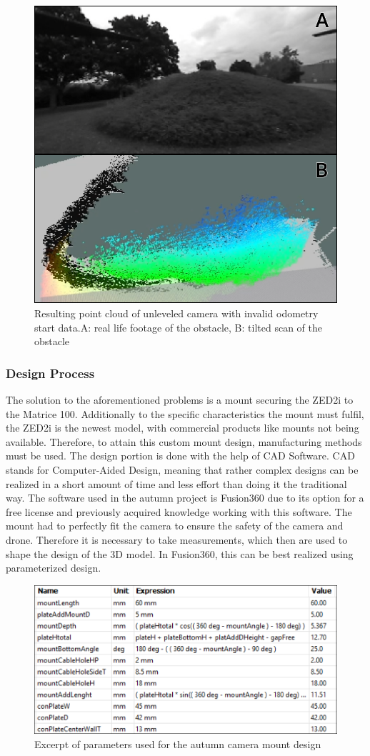 \begin{figure}[h]
	\centering
	\includegraphics[width=0.5\linewidth]{img/MisalignedOdom}
	\caption{Resulting point cloud of unleveled camera with invalid odometry start data.\newline A: real life footage of the obstacle, B: tilted scan of the obstacle}
	\label{fig:custom_parts_misalignedOdom}
\end{figure}

\subsubsection{Design Process}

The solution to the aforementioned problems is a mount securing the ZED2i to the Matrice 100. Additionally to the specific characteristics the mount must fulfil, the ZED2i is the newest model, with commercial products like mounts not being available. Therefore, to attain this custom mount design, manufacturing methods must be used. 
The design portion is done with the help of CAD Software. CAD stands for Computer-Aided Design, meaning that rather complex designs can be realized in a short amount of time and less effort than doing it the traditional way. The software used in the autumn project is Fusion360 due to its option for a free license and previously acquired knowledge working with this software. 
The mount had to perfectly fit the camera to ensure the safety of the camera and drone. Therefore it is necessary to take measurements, which then are used to shape the design of the 3D model. In Fusion360, this can be best realized using parameterized design.

\begin{figure}[h]
	\centering
	\includegraphics[width=0.7\linewidth]{img/Parameter}
	\caption{Excerpt of parameters used for the autumn camera mount design}
	\label{fig:custom_parts_parameter}
\end{figure}

